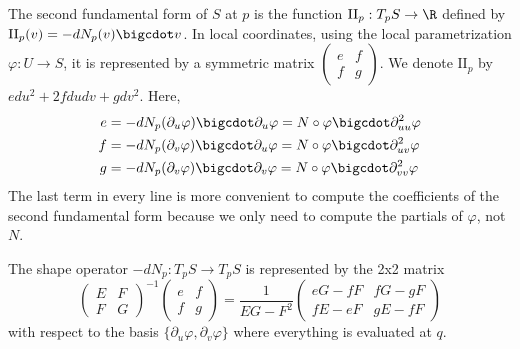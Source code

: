 \begin{definition}
    The second fundamental form of $S$ at $p$ is the function $\text{II}_p : T_pS \to \R$ defined by $\text{II}_p(v) = -dN_p(v)\bigcdot v$. In local coordinates, using the local parametrization $\varphi : U \to S$, it is represented by a symmetric matrix $\begin{pmatrix}
        e & f \\ f & g
    \end{pmatrix}$. We denote $\text{II}_p$ by $edu^2 + 2 fdudv + gdv^2$. Here,
    \begin{align*}
        e &= -dN_p(\partial_u \varphi)\bigcdot \partial_u \varphi = N\circ \varphi \bigcdot \partial_{uu}^2 \varphi \\
        f &= -dN_p(\partial_v \varphi)\bigcdot \partial_u \varphi = N\circ \varphi \bigcdot \partial_{uv}^2 \varphi \\
        g &= -dN_p(\partial_v \varphi)\bigcdot \partial_v \varphi = N\circ \varphi \bigcdot \partial_{vv}^2 \varphi 
    \end{align*}
    The last term in every line is more convenient to compute the coefficients of the second fundamental form because we only need to compute the partials of $\varphi$, not $N$.
\end{definition}

\begin{proposition}
    The shape operator $-dN_p : T_pS \to T_p S$ is represented by the 2x2 matrix
    $$\begin{pmatrix}
        E & F \\ F & G
    \end{pmatrix}^{-1}\begin{pmatrix}
        e & f \\ f & g
    \end{pmatrix} = \frac{1}{EG-F^2}\begin{pmatrix}
        eG - fF & fG - gF \\ fE - eF & gE - fF
    \end{pmatrix}$$
    with respect to the basis $\{\partial_u \varphi, \partial_v \varphi\}$ where everything is evaluated at $q$.
\end{proposition}


